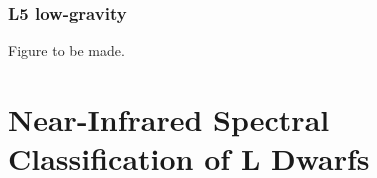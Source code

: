 \documentclass[12pt,preprint]{aastex}
\begin{document}
\subsubsection{L5 low-gravity}
Figure to be made.


% 




\section{Near-Infrared Spectral Classification of L Dwarfs}
\label{sec:classification}
\end{document}
